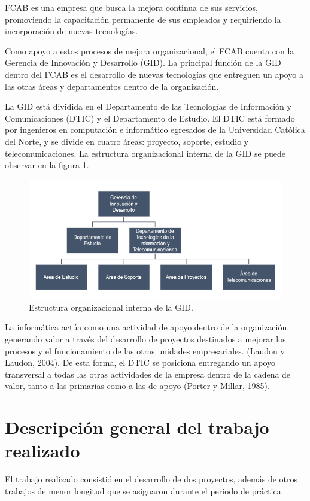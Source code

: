 \documentclass[oneside,12pt, letterpaper, titlepage]{book}
\begin{document}
FCAB es una empresa que busca la mejora continua de sus servicios, promoviendo la capacitación permanente de sus empleados y requiriendo la incorporación de nuevas tecnologías.

Como apoyo a estos procesos de mejora organizacional, el FCAB cuenta con la Gerencia de Innovación y Desarrollo (GID). La principal función de la GID dentro del FCAB es el desarrollo de nuevas tecnologías que entreguen un apoyo a las otras áreas y departamentos dentro de la organización. 

La GID está dividida en el Departamento de las Tecnologías de Información y Comunicaciones (DTIC) y el Departamento de Estudio. El DTIC está formado por ingenieros en computación e informático egresados de la Universidad Católica del Norte, y se divide en cuatro áreas: proyecto, soporte, estudio y telecomunicaciones. La estructura organizacional interna de la GID se puede observar en la figura \ref{fig:orgGID}.

\begin{figure}[H]
    \centering
    \includegraphics[scale=0.8]{./images/OrganigramaGID}
    \caption{Estructura organizacional interna de la GID.}
    \label{fig:orgGID}
\end{figure}

La informática actúa como una actividad de apoyo dentro de la organización, generando valor a través del desarrollo de  proyectos destinados a mejorar los procesos y el funcionamiento de las otras unidades empresariales. (Laudon y Laudon, 2004). De esta forma, el DTIC se posiciona entregando un apoyo transversal a todas las otras actividades de la empresa dentro de la cadena de valor, tanto a las primarias como a las de apoyo (Porter y Millar, 1985).

\section{Descripción general del trabajo realizado}
El trabajo realizado consistió en el desarrollo de dos proyectos, además de otros trabajos de menor longitud que se asignaron durante el periodo de práctica.
\end{document}
